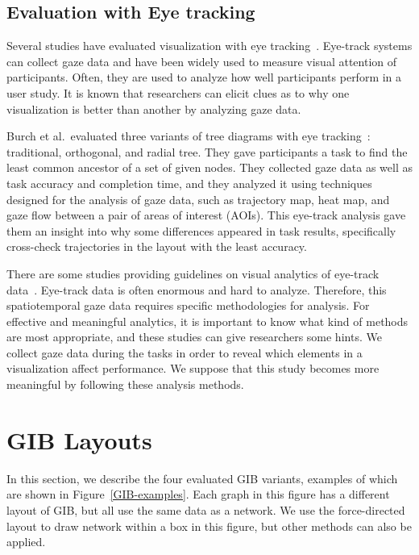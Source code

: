 \documentclass[review]{vgtc}                 %
\begin{document}
\subsection{Evaluation with Eye tracking}
Several studies have evaluated visualization with eye tracking~\cite{burch2011evaluation,pohl2009comparing,netzel2014comparative,jianu2014display,7539393}. Eye-track systems can collect gaze data and have been widely used to measure visual attention of participants. Often, they are used to analyze how well participants perform in a user study. It is known that researchers can elicit clues as to why one visualization is better than another by analyzing gaze data.

Burch et al.\ evaluated three variants of tree diagrams with eye tracking~\cite{burch2011evaluation}: traditional, orthogonal, and radial tree. They gave participants a task to find the least common ancestor of a set of given nodes. They collected gaze data as well as task accuracy and completion time, and they analyzed it using techniques designed for the analysis of gaze data, such as trajectory map, heat map, and gaze flow between a pair of areas of interest (AOIs). This eye-track analysis gave them an insight into why some differences appeared in task results, specifically cross-check trajectories in the layout with the least accuracy.

There are some studies providing guidelines on visual analytics of eye-track data~\cite{andrienko2012visual,kurzhals2014evaluating,duchowski2007eye}.
Eye-track data is often enormous and hard to analyze. Therefore, this spatiotemporal gaze data requires specific methodologies for analysis.
For effective and meaningful analytics, it is important to know what kind of methods are most appropriate, and these studies can give researchers some hints.
We collect gaze data during the tasks in order to reveal which elements in a visualization affect performance. We suppose that this study becomes more meaningful by following these analysis methods.


\section{GIB Layouts}
In this section, we describe the four evaluated GIB variants,  examples of which are shown in Figure~\ref{GIB-examples}.
Each graph in this figure has a different layout of GIB, but all use the same data as a network.
We use the force-directed layout to draw network within a box in this figure, but other methods can also be applied.
\end{document}

